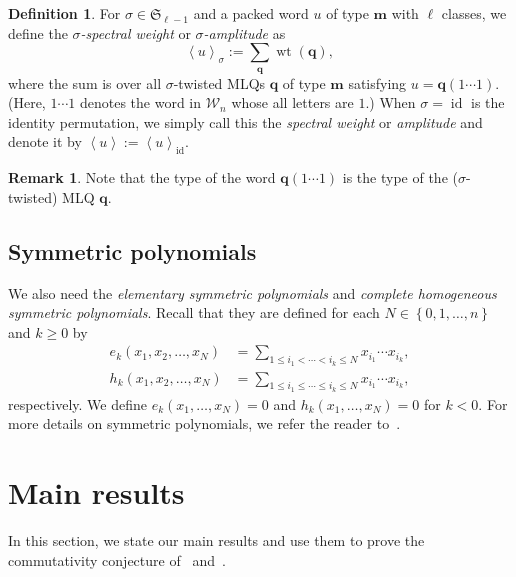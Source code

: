 \documentclass[reqno]{amsart}
\newcommand{\0}{\phantom{c}}
\newcommand{\swt}[1]{\left\langle #1 \right\rangle} %
\newcommand{\SymGp}[1]{\mathfrak{S}_{#1}} %
\DeclareMathOperator{\wt}{wt} %
\DeclareMathOperator{\id}{id} %
\newcommand{\mm}{\mathbf{m}}
\newcommand{\qq}{\mathbf{q}}
\newcommand{\mcW}{\mathcal{W}}
\let\sumnonlimits\sum
\renewcommand{\sum}{\sumnonlimits\limits}
\newcommand{\defn}[1]{{\color{darkred}\emph{#1}}} %
\theoremstyle{plain}
\theoremstyle{definition}
\newtheorem{dfn}[thm]{Definition}
\newtheorem{remark}[thm]{Remark}
\numberwithin{equation}{section}
\begin{document}
\begin{dfn}
For $\sigma \in \SymGp{\ell-1}$ and a packed word $u$ of type $\mm$ with $\ell$ classes, we define the \defn{$\sigma$-spectral weight} or \defn{$\sigma$-amplitude} as
\begin{equation}
\label{eq:amplitude}
  \swt{u}_{\sigma} := \sum_{\qq} \wt(\qq),
\end{equation}
where the sum is over all $\sigma$-twisted MLQs $\qq$ of type $\mm$ satisfying $u = \qq(1 \dotsm 1)$.
(Here, $1 \dotsm 1$ denotes the word in $\mcW_n$ whose all letters are $1$.)
When $\sigma = \id$ is the identity permutation, we simply call this the \defn{spectral weight} or \defn{amplitude} and denote it by $\swt{u} := \swt{u}_{\id}$.
\end{dfn}

\begin{remark}
Note that the type of the word $\qq(1 \dotsm 1)$ is the type of the ($\sigma$-twisted) MLQ $\qq$.
\end{remark}


\subsection{Symmetric polynomials}

We also need the \defn{elementary symmetric polynomials} and \defn{complete homogeneous symmetric polynomials}.
Recall that they are defined for each $N \in \left\{0,1,\ldots,n\right\}$ and $k \geq 0$ by
\begin{align*}
e_k(x_1, x_2, \dotsc, x_N) & = \sum_{1 \leq i_1 < \cdots < i_k \leq N} x_{i_1} \dotsm x_{i_k},
\\ h_k(x_1, x_2, \dotsc, x_N) & = \sum_{1 \leq i_1 \leq \cdots \leq i_k \leq N} x_{i_1} \dotsm x_{i_k},
\end{align*}
respectively.
We define $e_k(x_1, \dotsc, x_N) = 0$ and $h_k(x_1, \dotsc, x_N) = 0$ for $k < 0$.
For more details on symmetric polynomials, we refer the reader to~\cite[Ch.~7]{Stanley-EC2}.








\section{Main results}
\label{sec:result}


In this section, we state our main results and use them to prove the commutativity conjecture of~\cite{AAMP} and~\cite[Conj.~3.10]{AasLin17}.
\end{document}
